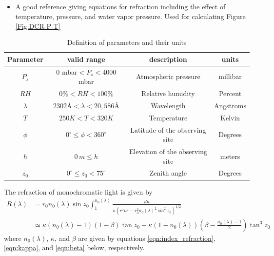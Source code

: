 \documentclass[]{article}
\begin{document}
\subsection{\cite{AlejandroPlazas2012}}

\subsection{\cite{Stone1996}}
\begin{itemize}
	\item A good reference giving equations for refraction
          including the effect of temperature, pressure, and water
          vapor pressure. Used for calculating Figure
          \ref{Fig:DCR-P-T}

\end{itemize}

\begin{table}[h!]
	\begin{center}
	\begin{tabular}{c | c | c | c}
		Parameter & valid range & description & units \\
		\hline
		$P_s$& $0$ mbar$ < P_s < 4000$ mbar & Atmospheric pressure & millibar  \\
		$RH$ & $0\% < RH < 100\%$ & Relative humidity & Percent \\
		$\lambda$& $2302$\AA{}$ < \lambda < 20,586 $\AA{} & Wavelength  & Angstroms \\
		$T$& $250K < T < 320K$ & Temperature & Kelvin \\
		$\phi$ & $0^\circ \leq \phi < 360^\circ$ & Latitude of the observing site & Degrees \\
		$h$ & $0\,m\leq h$ & Elevation of the observing site & meters \\
		$z_0$ & $0^\circ\leq z_0 < 75^\circ$ & Zenith angle & Degrees
	\end{tabular}
	\end{center}
	\caption{Definition of parameters and their units}
\end{table}

The refraction of monochromatic light is given by
\begin{align}
R(\lambda) &= r_0 n_0(\lambda) \sin z_0 \int_1^{n_0(\lambda)} \frac{dn}{n \left(r^2n^2 -r_0^2n_0(\lambda)^2\sin^2z_0\right)^{1/2}} \nonumber\\
&\simeq \kappa (n_0(\lambda) - 1) (1 - \beta) \tan z_0 - \kappa (1 - n_0(\lambda)) \left(\beta - \frac{n_0(\lambda) - 1}{2}\right) \tan^3z_0
\end{align}
where $n_0(\lambda)$, $\kappa$, and $\beta$ are given by equations \ref{eqn:index_refraction}, \ref{eqn:kappa}, and \ref{eqn:beta} below, respectively.
\end{document}
